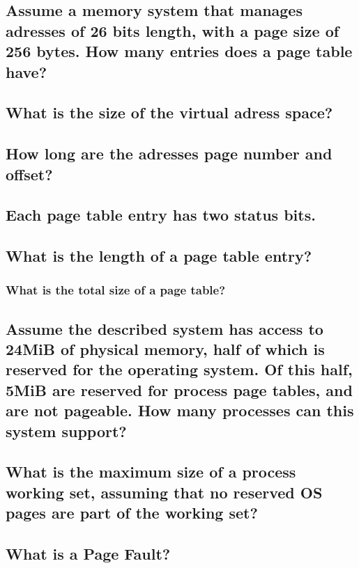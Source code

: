 \subsection{Assume a memory system that manages adresses of 26 bits length, with a page size of 256 bytes. How many entries does a page table have?}

\subsection{What is the size of the virtual adress space?}

\subsection{How long are the adresses page number and offset?}

\subsection{Each page table entry has two status bits.}

\subsection{What is the length of a page table entry?}

\subsubsection{What is the total size of a page table?}

\subsection{Assume the described system has access to 24MiB of physical memory, half of which is reserved for the operating system. Of this half, 5MiB are reserved for process page tables, and are not pageable. How many processes can this system support?}

\subsection{What is the maximum size of a process working set, assuming that no reserved OS pages are part of the working set?}

\subsection{What is a Page Fault?}

